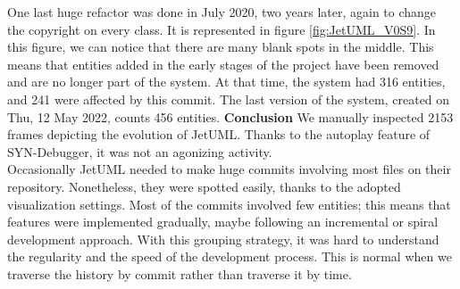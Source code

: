 One last huge refactor was done in July 2020, two years later, again to change the copyright on every class. It is represented in figure \ref{fig:JetUML_V0S9}. In this figure, we can notice that there are many blank spots in the middle. This means that entities added in the early stages of the project have been removed and are no longer part of the system. At that time, the system had 316 entities, and 241 were affected by this commit. 
\bigbreak
The last version of the system, created on Thu, 12 May 2022, counts 456 entities. 
\bigbreak
\textbf{Conclusion}
We manually inspected 2153 frames depicting the evolution of JetUML.
Thanks to the autoplay feature of SYN-Debugger, it was not an agonizing activity. \\
Occasionally JetUML needed to make huge commits involving most files on their repository. Nonetheless, they were spotted easily, thanks to the adopted visualization settings. 
Most of the commits involved few entities; this means that features were implemented gradually, maybe following an incremental or spiral development approach. 
With this grouping strategy, it was hard to understand the regularity and the speed of the development process. This is normal when we traverse the history by commit rather than traverse it by time. 

